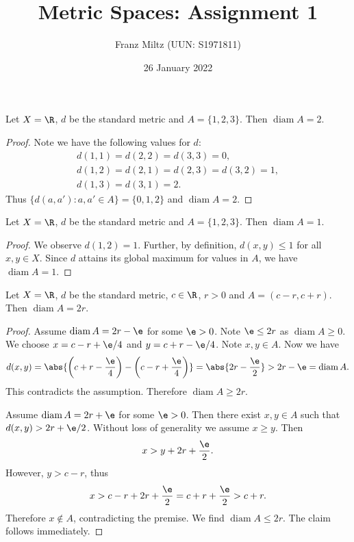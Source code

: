 \documentclass{article}
\DeclareMathOperator{\diam}{diam}
\begin{document}
\title{Metric Spaces: Assignment 1}
\author{Franz Miltz (UUN: S1971811)}
\date{26 January 2022}
\maketitle

\begin{claim*}[1a]
	Let $X=\R$, $d$ be the standard metric and $A=\{1,2,3\}$. Then $\diam A = 2$.
	\begin{proof}
		Note we have the following values for $d$:
		\begin{align*}
			d(1,1) = d(2,2) = d(3,3) = 0,          \\
			d(1,2) = d(2,1) = d(2,3) = d(3,2) = 1, \\
			d(1,3) = d(3,1) = 2.
		\end{align*}
		Thus $\{d(a,a'):a,a'\in A\}=\{0,1,2\}$ and $\diam A = 2$.
	\end{proof}
\end{claim*}

\begin{claim*}[1b]
	Let $X=\R$, $d$ be the standard metric and $A=\{1,2,3\}$. Then $\diam A=1$.
	\begin{proof}
		We observe $d(1,2)=1$. Further, by definition, $d(x,y)\leq 1$ for all $x,y\in X$.
		Since $d$ attains its global maximum for values in $A$, we have $\diam A=1$.
	\end{proof}
\end{claim*}

\begin{claim*}[2]
	Let $X=\R$, $d$ be the standard metric, $c\in\R$, $r>0$ and $A=(c-r,c+r)$. Then
	$\diam A = 2r$.
	\begin{proof}
		Assume $\diam A = 2r-\e$ for some $\e>0$. Note $\e\leq 2r$ as $\diam A \geq 0$.
		We choose $x=c-r+\e/4$ and $y=c+r-\e/4$. Note $x,y\in A$. Now we have
		\begin{align*}
			d(x,y) = \abs{\left(c+r-\frac{\e}{4}\right)-\left(c-r+\frac{\e}{4}\right)}
			= \abs{2r-\frac{\e}{2}} > 2r - \e = \diam A.
		\end{align*}
		This contradicts the assumption. Therefore $\diam A \geq 2r$.

		Assume $\diam A = 2r+\e$ for some $\e>0$. Then there exist $x,y\in A$ such that
		$d(x,y) > 2r+\e/2$. Without loss of generality we assume $x\geq y$. Then
		\begin{align*}
			x > y + 2r + \frac{\e}{2}.
		\end{align*}
		However, $y > c - r$, thus
		\begin{align*}
			x > c - r + 2r + \frac{\e}{2} = c + r + \frac{\e}{2} > c + r.
		\end{align*}
		Therefore $x\not\in A$, contradicting the premise. We find $\diam A \leq 2r$.
		The claim follows immediately.
	\end{proof}
\end{claim*}
\end{document}
